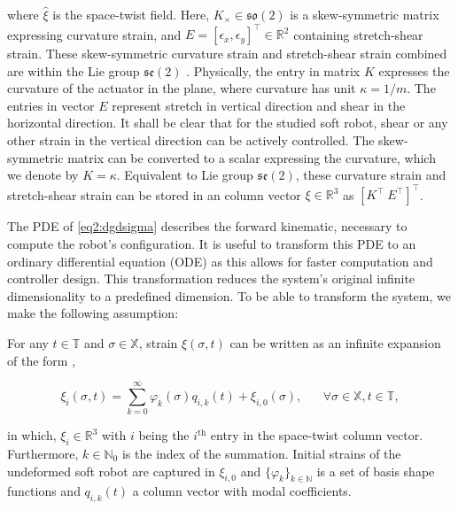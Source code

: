where $\hat{\xi}$ is the space-twist field. Here, $K_\times \in \mathfrak{so}(2)$ is a skew-symmetric matrix expressing curvature strain, and $E = [\epsilon_x,\epsilon_y]^\top \in \mathbb{R}^2$ containing stretch-shear strain. These skew-symmetric curvature strain and stretch-shear strain combined are within the Lie group $\mathfrak{se}(2)$ \cite{Sola2018}. Physically, the entry in matrix $K$ expresses the curvature of the actuator in the plane, where curvature has unit $\kappa = 1/m$. The entries in vector $E$ represent stretch in vertical direction and shear in the horizontal direction. It shall be clear that for the studied soft robot, shear or any other strain in the vertical direction can be actively controlled. The skew-symmetric matrix can be converted to a scalar expressing the curvature, which we denote by $K = \kappa$. Equivalent to Lie group $\mathfrak{se}(2)$, these curvature strain and stretch-shear strain can be stored in an column vector $\xi \in \mathbb{R}^3$ as $[K^\top \hspace{3pt} E^\top ]^\top$.

The PDE of \ref{eq2:dgdsigma} describes the forward kinematic, necessary to compute the robot's configuration. It is useful to transform this PDE to an ordinary differential equation (ODE) as this allows for faster computation and controller design. This transformation reduces the system's original infinite dimensionality to a predefined dimension. To be able to transform the system, we make the following assumption: 

\begin{theorem}

For any $t \in \mathbb{T}$ and $\sigma \in \mathbb{X}$, strain $\xi(\sigma,t)$ can be written as an infinite expansion of the form \cite{Caasenbrood2021},

\begin{equation}
\xi_i(\sigma,t) = \sum_{k=0}^\infty \varphi_k(\sigma)q_{i,k}(t) + \xi_{i,0}(\sigma), \hspace{20pt} \forall \sigma \in \mathbb{X}, t \in \mathbb{T},
\label{eq2:strainexact}
\end{equation}

in which, $\xi_{i} \in \mathbb{R}^3 $ with $i$ being the $i^{\text{th}}$ entry in the space-twist column vector. Furthermore, $k \in \mathbb{N}_0$ is the index of the summation. Initial strains of the undeformed soft robot are captured in $\xi_{i,0}$ and $\{\varphi_k\}_{k \in \mathbb{N}}$ is a set of basis shape functions and $q_{i,k}(t)$ a column vector with modal coefficients. 
\end{theorem}

